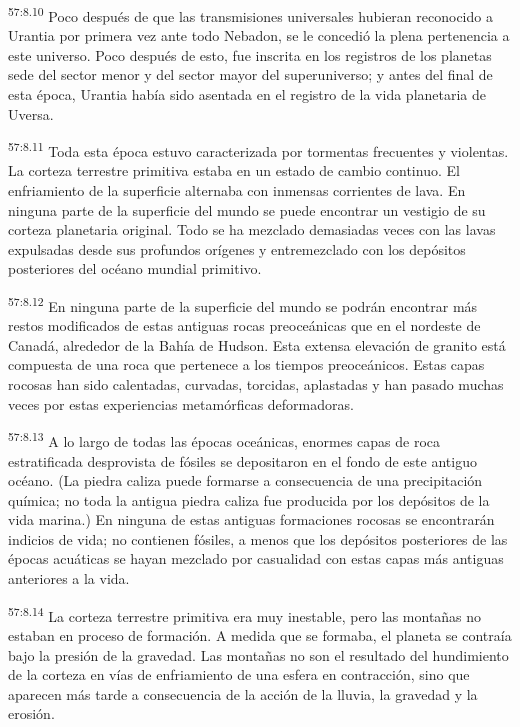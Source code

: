 \par
\textsuperscript{57:8.10} Poco después de que las transmisiones universales hubieran reconocido a Urantia por primera vez ante todo Nebadon, se le concedió la plena pertenencia a este universo. Poco después de esto, fue inscrita en los registros de los planetas sede del sector menor y del sector mayor del superuniverso; y antes del final de esta época, Urantia había sido asentada en el registro de la vida planetaria de Uversa.

\par
\textsuperscript{57:8.11} Toda esta época estuvo caracterizada por tormentas frecuentes y violentas. La corteza terrestre primitiva estaba en un estado de cambio continuo. El enfriamiento de la superficie alternaba con inmensas corrientes de lava. En ninguna parte de la superficie del mundo se puede encontrar un vestigio de su corteza planetaria original. Todo se ha mezclado demasiadas veces con las lavas expulsadas desde sus profundos orígenes y entremezclado con los depósitos posteriores del océano mundial primitivo.

\par
\textsuperscript{57:8.12} En ninguna parte de la superficie del mundo se podrán encontrar más restos modificados de estas antiguas rocas preoceánicas que en el nordeste de Canadá, alrededor de la Bahía de Hudson. Esta extensa elevación de granito está compuesta de una roca que pertenece a los tiempos preoceánicos. Estas capas rocosas han sido calentadas, curvadas, torcidas, aplastadas y han pasado muchas veces por estas experiencias metamórficas deformadoras.

\par
\textsuperscript{57:8.13} A lo largo de todas las épocas oceánicas, enormes capas de roca estratificada desprovista de fósiles se depositaron en el fondo de este antiguo océano. (La piedra caliza puede formarse a consecuencia de una precipitación química; no toda la antigua piedra caliza fue producida por los depósitos de la vida marina.) En ninguna de estas antiguas formaciones rocosas se encontrarán indicios de vida; no contienen fósiles, a menos que los depósitos posteriores de las épocas acuáticas se hayan mezclado por casualidad con estas capas más antiguas anteriores a la vida.

\par
\textsuperscript{57:8.14} La corteza terrestre primitiva era muy inestable, pero las montañas no estaban en proceso de formación. A medida que se formaba, el planeta se contraía bajo la presión de la gravedad. Las montañas no son el resultado del hundimiento de la corteza en vías de enfriamiento de una esfera en contracción, sino que aparecen más tarde a consecuencia de la acción de la lluvia, la gravedad y la erosión.


